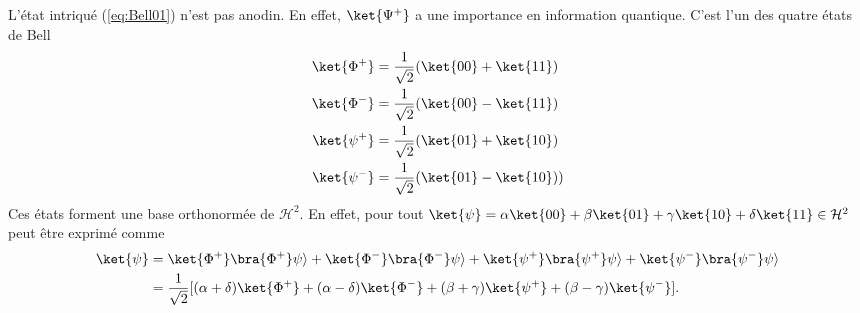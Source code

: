 L'état intriqué (\ref{eq:Bell01}) n'est pas anodin. En effet, $\ket{\Psi^+}$ a
une importance en information quantique. C'est l'un des quatre états de Bell
\begin{subequations}%
\label{eq:BellBase0}%
\begin{align}
\ket{\Phi^{+}} &  =\frac{1}{\sqrt{2}}(\ket{00}+\ket{11} )\\
\ket{\Phi^{-}} &  =\frac{1}{\sqrt{2}}(\ket{00}-\ket{11} )\\
\ket{\psi^{+}} &  =\frac{1}{\sqrt{2}}(\ket{01}+\ket{10} )\\
\ket{\psi^{-}} &  =\frac{1}{\sqrt{2}}(\ket{01}-\ket{10} ))
\end{align}%
\end{subequations}
Ces états forment une base orthonormée de $\mathcal{H}^2$. En effet, pour tout
$\ket{\psi}=\alpha\ket{00}+\beta\ket{01}+\gamma\ket{10}+\delta\ket{11}
\in\mathcal{H}^2$ peut être exprimé comme
\begin{equation}
\begin{split}
 \ket{\psi} &=\ket{\Phi^+}\bra{\Phi^+}\psi\rangle+\ket{\Phi^-}\bra{\Phi^-}
\psi\rangle+\ket{\psi^+}\bra{\psi^+}\psi\rangle+\ket{\psi^-}\bra{\psi^-}
\psi\rangle\\
 & =\frac{1}{\sqrt{2}}[(\alpha+\delta)\ket{\Phi^+}+(\alpha-\delta)\ket{\Phi^-}
+(\beta+\gamma)\ket{\psi^+}+(\beta-\gamma)\ket{\psi^-}].
\end{split}
\end{equation}

